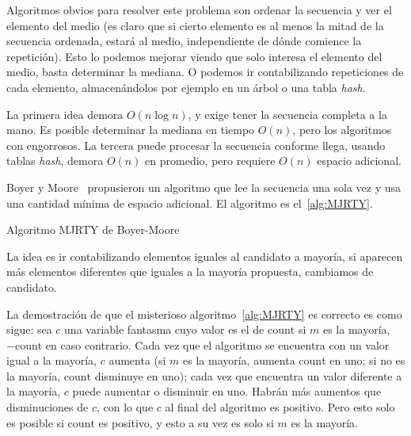   Algoritmos obvios para resolver este problema son ordenar la secuencia
  y ver el elemento del medio
  (es claro que si cierto elemento
   es al menos la mitad de la secuencia ordenada,
   estará al medio,
   independiente de dónde comience la repetición).
  Esto lo podemos mejorar viendo que solo interesa el elemento del medio,
  basta determinar la mediana.
  O podemos ir contabilizando repeticiones de cada elemento,
  almacenándolos por ejemplo en un árbol
  o una tabla \emph{\foreignlanguage{english}{hash}}.

  La primera idea demora \(O(n \log n)\),
  y exige tener la secuencia completa a la mano.
  Es posible determinar la mediana en tiempo \(O(n)\),
  pero los algoritmos con engorrosos.
  La tercera puede procesar la secuencia conforme llega,
  usando tablas \emph{\foreignlanguage{english}{hash}},
  demora \(O(n)\) en promedio,
  pero requiere \(O(n)\) espacio adicional.

  Boyer y Moore~%
    \cite{boyer91:_mjrty_fast_majority_vote_algor}
  propusieron un algoritmo que lee la secuencia una sola vez
  y usa una cantidad mínima de espacio adicional.
  El algoritmo es el~\ref{alg:MJRTY}.
  \begin{algorithm}[ht]
    \DontPrintSemicolon\Indp

    \caption{Algoritmo MJRTY de Boyer-Moore}
    \label{alg:MJRTY}
  \end{algorithm}
  La idea es ir contabilizando elementos iguales al candidato a mayoría,
  si aparecen más elementos diferentes que iguales a la mayoría propuesta,
  cambiamos de candidato.

  La demostración de que el misterioso algoritmo~\ref{alg:MJRTY} es correcto
  es como sigue:
  sea \(c\) una variable fantasma cuyo valor es el de \(\mathrm{count}\)
  si \(m\) es la mayoría,
  \(- \mathrm{count}\) en caso contrario.
  Cada vez que el algoritmo se encuentra con un valor igual a la mayoría,
  \(c\) aumenta
  (si \(m\) es la mayoría,
   aumenta \(\mathrm{count}\) en uno;
   si no es la mayoría,
   \(\mathrm{count}\) disminuye en uno);
  cada vez que encuentra un valor diferente a la mayoría,
  \(c\) puede aumentar o disminuir en uno.
  Habrán más aumentos que disminuciones de \(c\),
  con lo que \(c\) al final del algoritmo es positivo.
  Pero esto solo es posible si \(\mathrm{count}\) es positivo,
  y esto a su vez es solo si \(m\) es la mayoría.

